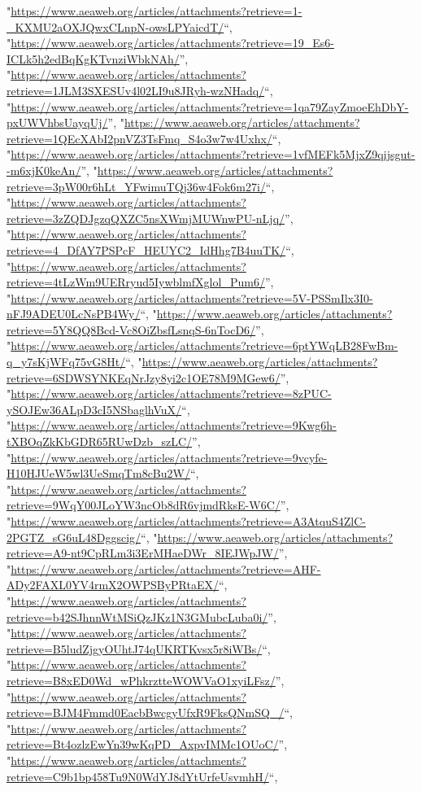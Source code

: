\documentclass[]{article}
\begin{document}
\begin{itemize}
  "\url{https://www.aeaweb.org/articles/attachments?retrieve=1-_KXMU2aOXJQwxCLnpN-owsLPYaicdT/}``,
  "\url{https://www.aeaweb.org/articles/attachments?retrieve=19_Es6-ICLk5h2edBqKgKTvnziWbkNAh/}'',
  "\url{https://www.aeaweb.org/articles/attachments?retrieve=1JLM3SXESUv4l02LI9u8JRyh-wzNHadq/}``,
  "\url{https://www.aeaweb.org/articles/attachments?retrieve=1qa79ZayZmoeEhDbY-pxUWVhbsUayqUj/}'',
  "\url{https://www.aeaweb.org/articles/attachments?retrieve=1QEcXAbI2pnVZ3TsFmq_S4o3w7w4Uxhx/}``,
  "\url{https://www.aeaweb.org/articles/attachments?retrieve=1vfMEFk5MjxZ9qijsgut--m6xjK0keAn/}'',
  "\url{https://www.aeaweb.org/articles/attachments?retrieve=3pW00r6hLt_YFwimuTQj36w4Fok6m27i/}``,
  "\url{https://www.aeaweb.org/articles/attachments?retrieve=3zZQDJgzqQXZC5nsXWmjMUWnwPU-nLjq/}'',
  "\url{https://www.aeaweb.org/articles/attachments?retrieve=4_DfAY7PSPcF_HEUYC2_IdHhg7B4uuTK/}``,
  "\url{https://www.aeaweb.org/articles/attachments?retrieve=4tLzWm9UERryud5IywblmfXglol_Pum6/}'',
  "\url{https://www.aeaweb.org/articles/attachments?retrieve=5V-PSSmIlx3I0-nFJ9ADEU0LcNsPB4Wy/}``,
  "\url{https://www.aeaweb.org/articles/attachments?retrieve=5Y8QQ8Bcd-Vc8OiZbsfLsnqS-6nTocD6/}'',
  "\url{https://www.aeaweb.org/articles/attachments?retrieve=6ptYWqLB28FwBm-q_y7sKjWFq75vG8Ht/}``,
  "\url{https://www.aeaweb.org/articles/attachments?retrieve=6SDWSYNKEqNrJzy8yi2c1OE78M9MGew6/}'',
  "\url{https://www.aeaweb.org/articles/attachments?retrieve=8zPUC-ySOJEw36ALpD3cI5NSbaglhVuX/}``,
  "\url{https://www.aeaweb.org/articles/attachments?retrieve=9Kwg6h-tXBOqZkKbGDR65RUwDzb_szLC/}'',
  "\url{https://www.aeaweb.org/articles/attachments?retrieve=9vcyfe-H10HJUeW5wl3UeSmqTm8cBu2W/}``,
  "\url{https://www.aeaweb.org/articles/attachments?retrieve=9WqY00JLoYW3ncOb8dR6vjmdRksE-W6C/}'',
  "\url{https://www.aeaweb.org/articles/attachments?retrieve=A3AtquS4ZlC-2PGTZ_sG6uL48Dggscig/}``,
  "\url{https://www.aeaweb.org/articles/attachments?retrieve=A9-nt9CpRLm3i3ErMHaeDWr_8IEJWpJW/}'',
  "\url{https://www.aeaweb.org/articles/attachments?retrieve=AHF-ADy2FAXL0YV4rmX2OWPSByPRtaEX/}``,
  "\url{https://www.aeaweb.org/articles/attachments?retrieve=b42SJhnnWtMSiQzJKz1N3GMubcLuba0i/}'',
  "\url{https://www.aeaweb.org/articles/attachments?retrieve=B5ludZjgyOUhtJ74qUKRTKvsx5r8iWBs/}``,
  "\url{https://www.aeaweb.org/articles/attachments?retrieve=B8xED0Wd_wPhkrztteWOWVaO1xyiLFsz/}'',
  "\url{https://www.aeaweb.org/articles/attachments?retrieve=BJM4Fmmd0EacbBwcgyUfxR9FksQNmSQ_/}``,
  "\url{https://www.aeaweb.org/articles/attachments?retrieve=Bt4ozlzEwYn39wKqPD_AxpvIMMc1OUoC/}'',
  "\url{https://www.aeaweb.org/articles/attachments?retrieve=C9b1bp458Tu9N0WdYJ8dYtUrfeUsvmhH/}``,

\end{itemize}
\end{document}
